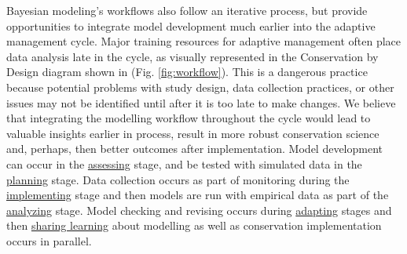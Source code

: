 \documentclass{article}
\begin{document}
\par Bayesian modeling's workflows also follow an iterative process, but provide opportunities to integrate model development much earlier into the adaptive management cycle. Major training resources for adaptive management often place data analysis late in the cycle, as visually represented in the Conservation by Design diagram shown in (Fig. \ref{fig:workflow}). This is a dangerous practice because potential problems with study design, data collection practices, or other issues may not be identified until after it is too late to make changes. We believe that integrating the modelling workflow throughout the cycle would lead to valuable insights earlier in process, result in more robust conservation science and, perhaps, then better outcomes after implementation. Model development can occur in the \underline{assessing} stage, and be tested with simulated data in the \underline{planning} stage. Data collection occurs as part of monitoring during the \underline{implementing} stage and then models are run with empirical data as part of the \underline{analyzing} stage. Model checking and revising occurs during \underline{adapting} stages and then \underline{sharing learning} about modelling as well as conservation implementation occurs in parallel.  
\end{document}
